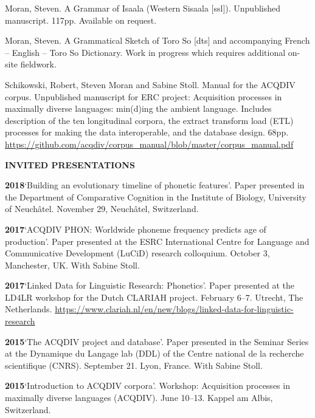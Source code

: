 \documentclass[11pt]{article}
\newcommand{\hangpara}{
 \setlength{\parindent}{0in} %
 \hangindent=0.42in %
}
\begin{document}
\vskip 6pt
\hangpara
Moran, Steven. A Grammar of Isaala (Western Sisaala [ssl]). Unpublished manuscript. 117pp. Available on request.

\vskip 6pt
\hangpara
Moran, Steven. A Grammatical Sketch of Toro So [dts] and accompanying French -- English -- Toro So Dictionary. Work in progress which requires additional  on-site fieldwork.

\vskip 6pt
\hangpara
Schikowski, Robert, Steven Moran and Sabine Stoll. Manual for the ACQDIV corpus. Unpublished manuscript for ERC project: Acquisition processes in maximally diverse languages: min(d)ing the ambient language. Includes description of the ten longitudinal corpora, the extract transform load (ETL) processes for making the data interoperable, and the database design. 68pp. \url{https://github.com/acqdiv/corpus_manual/blob/master/corpus_manual.pdf}

\vskip 20pt
\begin{flushleft}
{\bf INVITED PRESENTATIONS}
\end{flushleft}

\hangpara
{\bf 2018}\hspace{1ex}`Building an evolutionary timeline of phonetic features'. Paper presented in the Department of Comparative Cognition in the Institute of Biology, University of Neuchâtel. November 29, Neuchâtel, Switzerland.

\vskip 6pt
\hangpara
{\bf 2017}\hspace{1ex}`ACQDIV PHON: Worldwide phoneme frequency predicts age of production'. Paper presented at the ESRC International Centre for Language and Communicative Development (LuCiD) research colloquium. October 3, Manchester, UK. With Sabine Stoll.

\vskip 6pt
\hangpara
{\bf 2017}\hspace{1ex}`Linked Data for Linguistic Research: Phonetics'. Paper presented at the LD4LR workshop for the Dutch CLARIAH project. February 6--7. Utrecht, The Netherlands. \url{https://www.clariah.nl/en/new/blogs/linked-data-for-linguistic-research}

\vskip 6pt
\hangpara
{\bf 2015}\hspace{1ex}`The ACQDIV project and database'. Paper presented in the Seminar Series at the Dynamique du Langage lab (DDL) of the Centre national de la recherche scientifique (CNRS). September 21. Lyon, France. With Sabine Stoll.

\vskip 6pt
\hangpara
{\bf 2015}\hspace{1ex}`Introduction to ACQDIV corpora'. Workshop: Acquisition processes in maximally diverse languages (ACQDIV). June 10--13. Kappel am Albis, Switzerland.
\end{document}
